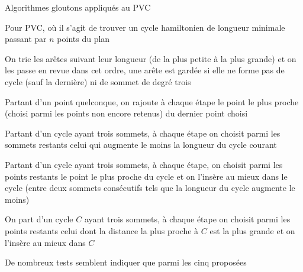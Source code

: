 \documentclass[aspectratio=1610,francais,envcountsect]{beamer}
\begin{document}
\begin{frame}[allowframebreaks]{Algorithmes gloutons appliqués au PVC}

  Pour PVC, où il s’agit de trouver un cycle hamiltonien de longueur
  minimale passant par $n$ points du plan

  \begin{example}
    On trie les arêtes suivant leur longueur (de la plus petite à la
    plus grande) et on les passe en revue dans cet ordre, une arête
    est gardée si elle ne forme pas de cycle (sauf la dernière) ni de
    sommet de degré trois
  \end{example}

  \begin{example}
    Partant d’un point quelconque, on rajoute à chaque étape le point
    le plus proche (choisi parmi les points non encore retenus) du
    dernier point choisi
  \end{example}
  
  \begin{example}
    Partant d’un cycle ayant trois sommets, à chaque étape on choisit
    parmi les sommets restants celui qui augmente le moins la longueur
    du cycle courant
  \end{example}

  \framebreak

\begin{example}
  Partant d’un cycle ayant trois sommets, à chaque étape, on choisit
  parmi les points restants le point le plus proche du cycle et on
  l’insère au mieux dans le cycle (entre deux sommets consécutifs tels
  que la longueur du cycle augmente le moins)
\end{example}

\begin{example}
  On part d’un cycle $C$ ayant trois sommets, à chaque étape on
  choisit parmi les points restants celui dont la distance la plus
  proche à $C$ est la plus grande et on l’insère au mieux dans $C$
\end{example}

\bigskip

De nombreux tests semblent indiquer que  parmi les cinq proposées

  
\end{frame}
\end{document}
